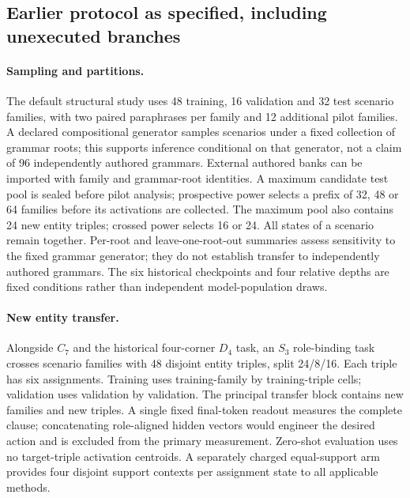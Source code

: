 \subsection{Earlier protocol as specified, including unexecuted branches}

\paragraph{Sampling and partitions.}
The default structural study uses 48 training, 16 validation and 32 test scenario families, with two paired paraphrases per family and 12 additional pilot families. A declared compositional generator samples scenarios under a fixed collection of grammar roots; this supports inference conditional on that generator, not a claim of 96 independently authored grammars. External authored banks can be imported with family and grammar-root identities. A maximum candidate test pool is sealed before pilot analysis; prospective power selects a prefix of 32, 48 or 64 families before its activations are collected. The maximum pool also contains 24 new entity triples; crossed power selects 16 or 24. All states of a scenario remain together. Per-root and leave-one-root-out summaries assess sensitivity to the fixed grammar generator; they do not establish transfer to independently authored grammars. The six historical checkpoints and four relative depths are fixed conditions rather than independent model-population draws.

\paragraph{New entity transfer.}
Alongside $C_7$ and the historical four-corner $D_4$ task, an $S_3$ role-binding task crosses scenario families with 48 disjoint entity triples, split 24/8/16. Each triple has six assignments. Training uses training-family by training-triple cells; validation uses validation by validation. The principal transfer block contains new families and new triples. A single fixed final-token readout measures the complete clause; concatenating role-aligned hidden vectors would engineer the desired action and is excluded from the primary measurement. Zero-shot evaluation uses no target-triple activation centroids. A separately charged equal-support arm provides four disjoint support contexts per assignment state to all applicable methods.

